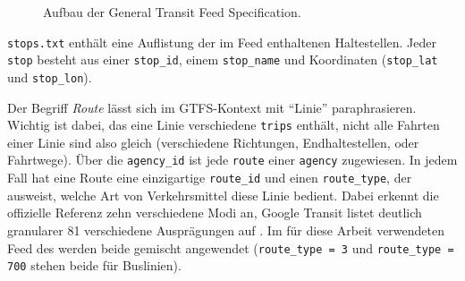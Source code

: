 \documentclass[11pt,pdftex,a4paper]{scrartcl}
\begin{document}
	\begin{figure}
		
		\caption{Aufbau der General Transit Feed Specification.}
		\label{fig:gtfs_structure}
	\end{figure}
	
	\texttt{stops.txt} enthält eine Auflistung der im Feed enthaltenen Haltestellen. Jeder \texttt{stop} besteht aus einer \texttt{stop\_id}, einem \texttt{stop\_name} und Koordinaten (\texttt{stop\_lat} und \texttt{stop\_lon}).
	
	Der Begriff \textit{Route} lässt sich im GTFS-Kontext mit \enquote{Linie} paraphrasieren. Wichtig ist dabei, das eine Linie verschiedene \texttt{trips} enthält, nicht alle Fahrten einer Linie sind also gleich (verschiedene Richtungen, Endhaltestellen, oder Fahrtwege). Über die \texttt{agency\_id} ist jede \texttt{route} einer \texttt{agency} zugewiesen. In jedem Fall hat eine Route eine einzigartige \texttt{route\_id} und einen \texttt{route\_type}, der ausweist, welche Art von Verkehrsmittel diese Linie bedient. Dabei erkennt die offizielle Referenz zehn verschiedene Modi an, Google Transit listet deutlich granularer 81 verschiedene Ausprägungen auf \parencite{googletransitErweiterteGTFSRoutentypen2026}. Im für diese Arbeit verwendeten Feed des \textcite{delfie.v.DeutschlandweiteSollFahrplandatenGTFS2026} werden beide gemischt angewendet (\texttt{route\_type = 3} und \texttt{route\_type = 700} stehen beide für Buslinien). 
	
\end{document}
